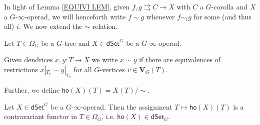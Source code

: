 \documentclass[a4paper,10pt
,draft
]{article}%
\renewcommand{\1}{\ensuremath{\mathbb{id}}}
\begin{document}
In light of Lemma \ref{EQUIVI LEM},
given $f,g \rightrightarrows C \to X$ with 
$C$ a $G$-corolla and $X$ a $G$-$\infty$-operad,
we will henceforth write $f \sim g$ whenever $f \sim_i g$ for some (and thus all) $i$.
We now extend the $\sim$ relation.

\begin{definition}\label{XTENDSIM DEF}
	Let $T \in \Omega_G$ be a $G$-tree
	and $X \in \mathsf{dSet}^G$ be a 
	$G$-$\infty$-operad.
	
	Given dendrices $x,y\colon T \to X$ we write
	$x \sim y$ if there are equivalences of restrictions
	$x|_{T_v} \sim y|_{T_v}$ for all $G$-vertices
	$v \in \boldsymbol{V}_G(T)$.
	
	Further, we define $\mathsf{ho}(X)(T) = X(T)/\sim$.
\end{definition}

\begin{proposition}
Let $X \in \mathsf{dSet}^G$ be a $G$-$\infty$-operad. Then the assignment 
		$T \mapsto \mathsf{ho}(X)(T)$
		is a contravariant functor in $T \in \Omega_G$, i.e.
		$\mathsf{ho}(X)\in \mathsf{dSet}_G$.
\end{proposition}
\end{document}
